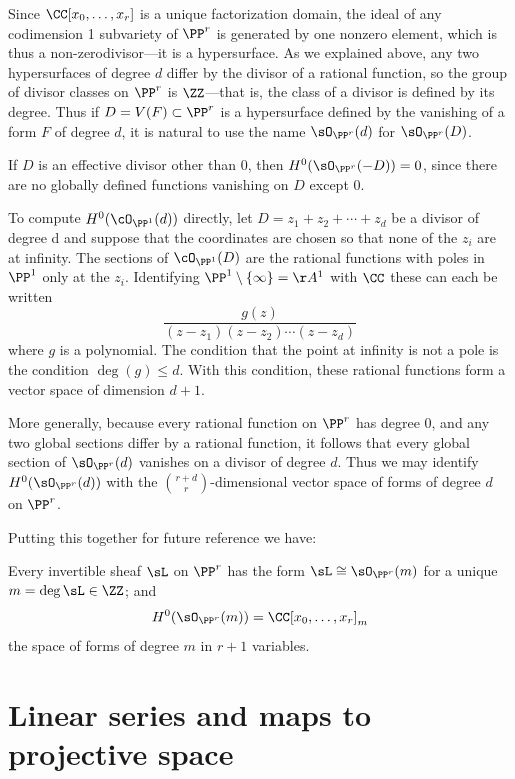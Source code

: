 \begin{example} \label{linear series on Pr} Since $\CC[x_0,\dots,x_r]$ is a 
unique factorization domain, the ideal of any codimension 1 subvariety of $\PP^r$ is generated by one
nonzero element, which is thus a non-zerodivisor---it is a hypersurface.  As we explained above,
any two hypersurfaces of degree $d$ differ by the divisor of a rational function, so
the group of divisor classes on $\PP^r$ is $\ZZ$---that is, the class of a divisor is defined by its degree.
Thus if $D = V(F)\subset \PP^{r}$ is a hypersurface defined by the vanishing of a  form 
$F$ of degree $d$,
it is natural to use the name $\sO_{\PP^r}(d)$  for $\sO_{\PP^r}(D)$.

If $D$ is an effective divisor other than 0, then $H^{0}(\sO_{\PP^{r}}(-D)) = 0$, since there are
no globally defined functions vanishing on $D$ except 0.
 
To compute $H^0(\cO_{\PP^1} (d))$ directly, let $D = z_1 +z_2 +\cdots+z_d$ be a divisor of degree d and suppose that the coordinates are chosen so that none of the $z_i$ are at infinity. The sections of $\cO_{\PP^1} (D)$ are the rational functions with poles in $\PP^1$ only at 
the $z_i$. Identifying $\PP^1\setminus \{\infty\} = \AA^1$ with $\CC$ these can each be written
$$
\frac{g(z)}{(z-z_1)(z-z_2)\cdots(z-z_d)}
$$
where $g$ is a polynomial. The condition that the point at infinity is not a pole is the condition $\deg(g) \leq d$. With this condition, these rational functions form a vector space of dimension $d+1$.

More generally, because every
rational function on $\PP^{r}$ has degree 0, and any two global sections differ by a rational
function, it follows that every global section of $\sO_{\PP^{r}}(d)$ vanishes on a divisor of degree $d$. Thus
we may identify $H^{0}(\sO_{\PP^{r}}(d))$ with the ${r+d\choose r}$-dimensional vector space of forms of degree $d$ on $\PP^{r}$.

Putting this together for future reference we have:
\begin{proposition}
 Every invertible sheaf $\sL$ on $\PP^r$ has the form $\sL \cong \sO_{\PP^r}(m)$ for a unique $m = \deg \sL \in \ZZ$; and
 $$
 H^0(\sO_{\PP^r}(m)) = \CC[x_0,\dots, x_r]_m
 $$
 the space of forms of degree $m$ in $r+1$ variables.
\end{proposition}
\end{example}


\section{Linear series and maps to projective space}

